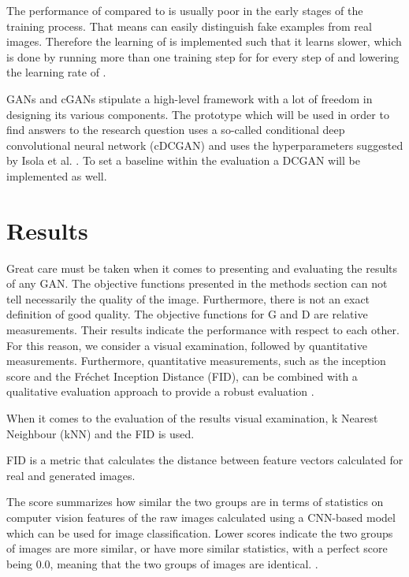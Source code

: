 \documentclass[journal]{IEEEtran}
\begin{document}
{{The performance of  compared to  is usually poor in the early stages of the training process. That means  can easily distinguish fake examples from real images. Therefore the learning of  is implemented such that it learns slower, which is done by running more than one training step for  for every step of  and lowering the learning rate of .

GANs and cGANs stipulate a high-level framework with a lot of freedom in designing its various components. The prototype which will be used in order to find answers to the research question uses a so-called conditional deep convolutional neural network (cDCGAN) and uses the hyperparameters suggested by Isola et al. \cite{DBLP:journals/corr/IsolaZZE16}.  To set a baseline within the evaluation a DCGAN will be implemented as well. 

\section{Results} 

Great care must be taken when it comes to presenting and evaluating the results of any GAN. The objective functions presented in the methods section can not tell necessarily the quality of the image. Furthermore, there is not an exact definition of good quality. The objective functions for G and D are relative measurements. Their results indicate the performance with respect to each other. For this reason, we consider a visual examination, followed by quantitative measurements. Furthermore, quantitative measurements, such as the inception score and the Fréchet Inception Distance (FID), can be combined with a qualitative evaluation approach to provide a robust evaluation \cite{DBLP:journals/corr/abs-1802-03446,DBLP:journals/corr/IsolaZZE16}.

When it comes to the evaluation of the results visual examination, k Nearest Neighbour (kNN) and the FID is used.

FID is a metric that calculates the distance between feature vectors calculated for real and generated images.

The score summarizes how similar the two groups are in terms of statistics on computer vision features of the raw images calculated using a CNN-based model which can be used for image classification. Lower scores indicate the two groups of images are more similar, or have more similar statistics, with a perfect score being 0.0, meaning that the two groups of images are identical.
 \cite{DBLP:journals/corr/HeuselRUNKH17}.

}}
\end{document}

